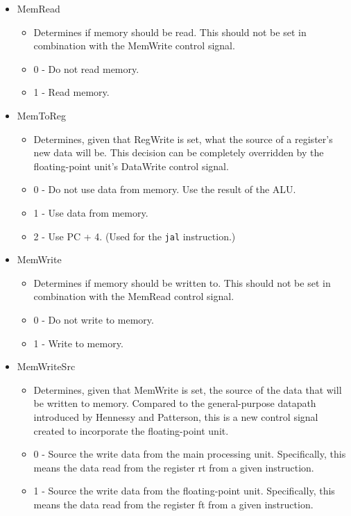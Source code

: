 \documentclass[
    paper=letter,
    parskip=half,
    fontsize=12pt,
    titlepage=firstiscover,
    toc=bibliography,
    numbers=endperiod
]{scrartcl}
\providecommand{\tightlist}{%
  \setlength{\itemsep}{0pt}\setlength{\parskip}{0pt}}
\begin{document}
\begin{itemize}
    \item MemRead
          \begin{itemize}
              \tightlist
              \item Determines if memory should be read. This should not be set in
                    combination with the MemWrite control signal.
              \item 0 - Do not read memory.
              \item 1 - Read memory.
          \end{itemize}

    \item MemToReg
          \begin{itemize}
              \tightlist
              \item Determines, given that RegWrite is set, what the source of a register's
                    new data will be. This decision can be completely overridden by the
                    floating-point unit's DataWrite control signal.
              \item 0 - Do not use data from memory. Use the result of the ALU.
              \item 1 - Use data from memory.
              \item 2 - Use PC + 4. (Used for the \texttt{jal} instruction.)
          \end{itemize}

    \item MemWrite
          \begin{itemize}
              \tightlist
              \item Determines if memory should be written to. This should not be set in
                    combination with the MemRead control signal.
              \item 0 - Do not write to memory.
              \item 1 - Write to memory.
          \end{itemize}

    \item MemWriteSrc
          \begin{itemize}
              \tightlist
              \item Determines, given that MemWrite is set, the source of the data that will
                    be written to memory. Compared to the general-purpose datapath
                    introduced by Hennessy and Patterson, this is a new control signal
                    created to incorporate the floating-point unit.
              \item 0 - Source the write data from the main processing unit.
                    Specifically, this means the data read from the register rt from a
                    given instruction.
              \item 1 - Source the write data from the floating-point unit.
                    Specifically, this means the data read from the register ft from a
                    given instruction.
          \end{itemize}


\end{itemize}
\end{document}
